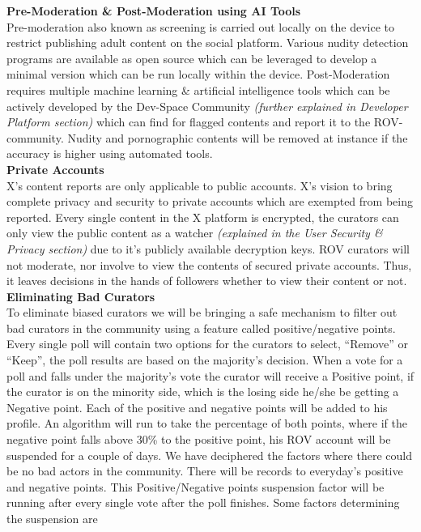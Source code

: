 \documentclass[letterpaper,11pt]{article}
\begin{document}
\textbf{Pre-Moderation \& Post-Moderation using AI Tools}\\

Pre-moderation also known as screening is carried out locally on the device to restrict publishing adult content on the social platform. Various nudity detection programs are available as open source which can be leveraged to develop a minimal version which can be run locally within the device. Post-Moderation requires multiple machine learning \& artificial intelligence tools which can be actively developed by the Dev-Space Community \textit{(further explained in Developer Platform section)} which can find for flagged contents and report it to the ROV-community. Nudity and pornographic contents will be removed at instance if the accuracy is higher using automated tools.\\

\textbf{Private Accounts}\\

X’s content reports are only applicable to public accounts. X’s vision to bring complete privacy and security to private accounts which are exempted from being reported.  Every single content in the X platform is encrypted, the curators can only view the public content as a watcher \textit{(explained in the User Security \& Privacy section)} due to it's publicly available decryption keys. ROV curators will not moderate, nor involve to view the contents of secured private accounts. Thus, it leaves decisions in the hands of followers whether to view their content or not. \\

\textbf{Eliminating Bad Curators}\\

To eliminate biased curators we will be bringing a safe mechanism to filter out bad curators in the community using a feature called positive/negative points. Every single poll will contain two options for the curators to select, “Remove” or “Keep”, the poll results are based on the majority’s decision. When a vote for a poll and falls under the majority’s vote the curator will receive a Positive point, if the curator is on the minority side, which is the losing side he/she be getting a Negative point. Each of the positive and negative points will be added to his profile. An algorithm will run to take the percentage of both points, where if the negative point falls above 30\% to the positive point, his ROV account will be suspended for a couple of days. We have deciphered the factors where there could be no bad actors in the community. There will be records to everyday's positive and negative points. This Positive/Negative points suspension factor will be running after every single vote after the poll finishes. Some factors determining the suspension are\\
\end{document}

